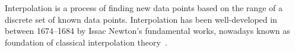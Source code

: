 Interpolation is a process of finding new data points based on the range of a discrete set of known data points.
Interpolation has been well-developed in between 1674--1684
by Issac Newton's fundamental works, nowadays known as foundation of classical interpolation
theory~\cite{meijering2002chronology}.

